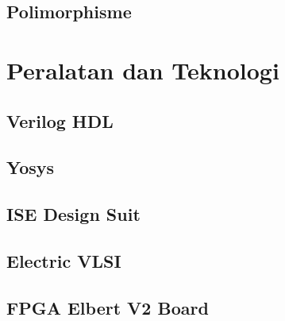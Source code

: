 \subsection{Polimorphisme}

\section{Peralatan dan Teknologi}

\subsection{Verilog HDL}

\subsection{Yosys}

\subsection{ISE Design Suit}

\subsection{Electric VLSI}

\subsection{FPGA Elbert V2 Board}
